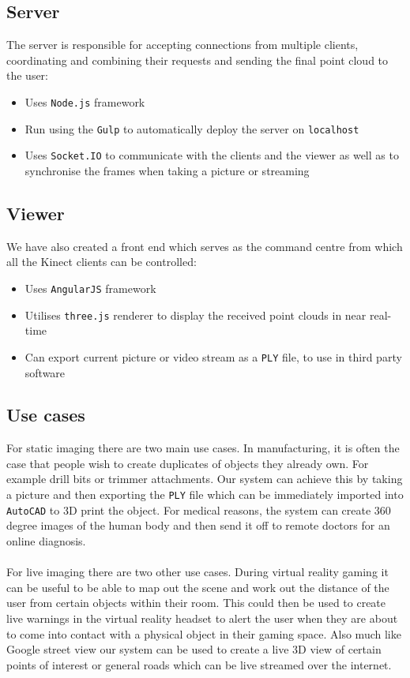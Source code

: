 \documentclass{article}
\begin{document}
\subsection{Server}
The server is responsible for accepting connections from multiple clients, coordinating and combining their requests and sending the final point cloud to the user:
\begin{itemize}
\item Uses \texttt{Node.js} \cite{node} framework
\item Run using the \texttt{Gulp} \cite{gulp} to automatically deploy the server on \texttt{localhost}
\item Uses \texttt{Socket.IO} \cite{socketio} to communicate with the clients and the viewer as well as to synchronise the frames when taking a picture or streaming
\end{itemize}
\newpage
\subsection{Viewer}
We have also created a front end which serves as the command centre from which all the Kinect clients can be controlled:
\begin{itemize}
\item Uses \texttt{AngularJS} \cite{angular} framework
\item Utilises \texttt{three.js} \cite{three} renderer to display the received point clouds in near real-time
\item Can export current picture or video stream as a \texttt{PLY} file, to use in third party software
\end{itemize}
\subsection{Use cases}
For static imaging there are two main use cases. In manufacturing, it is often the case that people wish to create duplicates of objects they already own. For example drill bits or trimmer attachments. Our system can achieve this by taking a picture and then exporting the \texttt{PLY} file which can be immediately imported into \texttt{AutoCAD} to 3D print the object. For medical reasons, the system can create 360 degree images of the human body and then send it off to remote doctors for an online diagnosis.
\\\\
For live imaging there are two other use cases. During virtual reality gaming it can be useful to be able to map out the scene and work out the distance of the user from certain objects within their room. This could then be used to create live warnings in the virtual reality headset to alert the user when they are about to come into contact with a physical object in their gaming space. Also much like Google street view our system can be used to create a live 3D view of certain points of interest or general roads which can be live streamed over the internet.
\newpage
\fi
\end{document}
